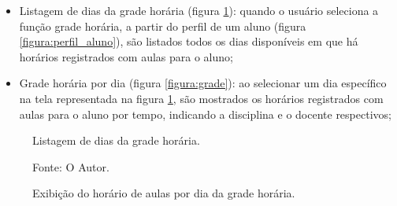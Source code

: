 \begin{itemize}
	\item Listagem de dias da grade horária (figura \ref{figura:grade_dias}): quando o usuário seleciona a função grade horária, a partir do perfil de um aluno (figura \ref{figura:perfil_aluno}), são listados todos os dias disponíveis em que há horários registrados com aulas para o aluno;
	\item Grade horária por dia (figura \ref{figura:grade}): ao selecionar um dia específico na tela representada na figura \ref{figura:grade_dias}, são mostrados os horários registrados com aulas para o aluno por tempo, indicando a disciplina e o docente respectivos;
\end{itemize}

\begin{figure}[H]
    \begin{minipage}[b]{0.45\linewidth}
        \caption{Listagem de dias da grade horária.}
    	\centering %
    	\label{figura:grade_dias}
    	\captionsetup{singlelinecheck = false, format= hang, justification=raggedright, labelsep=space, width=6.5cm}
    	\caption*{\footnotesize Fonte: O Autor.}
    \end{minipage}
    \hspace{0.5cm}
    \begin{minipage}[b]{0.45\linewidth}
        \caption{Exibição do horário de aulas por dia da grade horária.}
    	\centering %

\end{minipage}
\end{figure}
